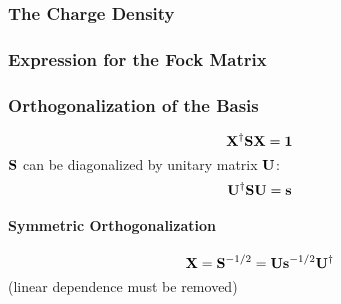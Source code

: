 \documentclass[a4paper]{article}
\newcommand{\iden}{{\large \bm{1}}}
\numberwithin{equation}{section}
\begin{document}
\subsubsection{The Charge Density}

\subsubsection{Expression for the Fock Matrix}

\subsubsection{Orthogonalization of the Basis}
\begin{equation}\label{key}
\vb{X}^\dagger \vb{S} \vb{X} = \iden
\end{equation}
$ \vb{S} $ can be diagonalized by unitary matrix $ \vb{U} $:
\begin{equation}\label{key}
\vb{U}^\dagger \vb{S} \vb{U} = \vb{s}
\end{equation}
\paragraph{Symmetric Orthogonalization}
\begin{equation}\label{key}
\vb{X} = \vb{S}^{-1/2} = \vb{U}\vb{s}^{-1/2}\vb{U}^\dagger
\end{equation}
(linear dependence must be removed)
\end{document}
